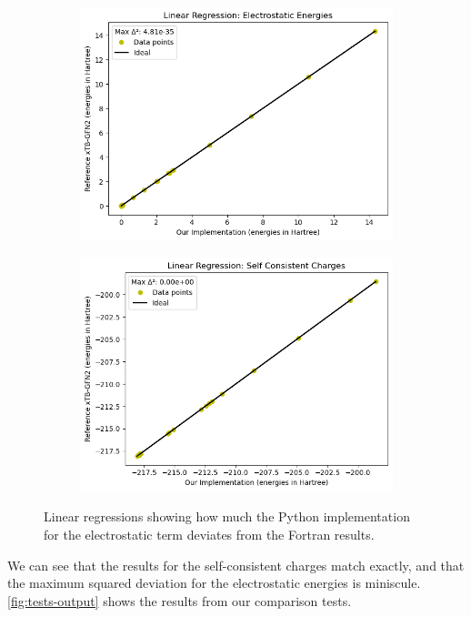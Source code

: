 \begin{figure}[H]
\centering
\begin{subfigure}{.5\textwidth}
  \centering
  \includegraphics[width=.9\linewidth]{images/results/es_check}
  \label{fig:es_check}
\end{subfigure}%
\begin{subfigure}{.5\textwidth}
  \centering
  \includegraphics[width=.9\linewidth]{images/results/scc_check}
  \label{fig:scc_check}
\end{subfigure}
\caption{Linear regressions showing how much the Python implementation for the electrostatic term deviates from the Fortran results.}
\label{fig:validation_electro_precision}
\end{figure}

We can see that the results for the self-consistent charges match exactly, and that the maximum squared deviation for the electrostatic energies is miniscule. \autoref{fig:tests-output} shows the results from our comparison tests.

